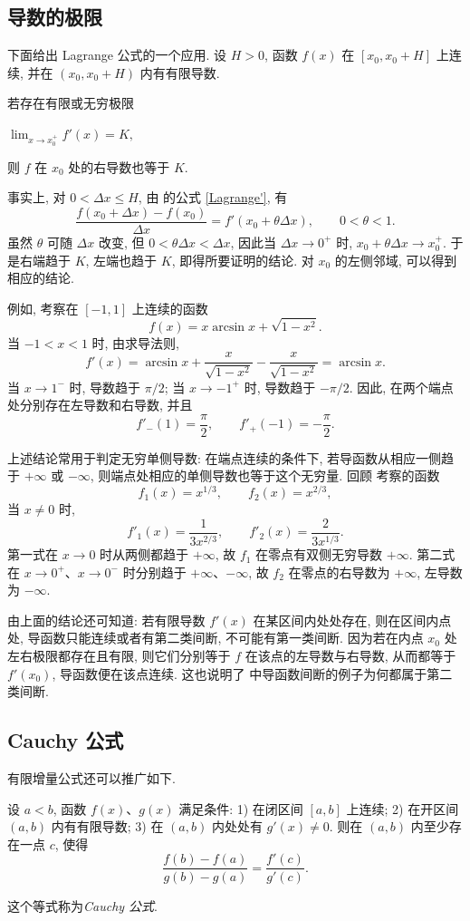 \subsection{导数的极限}\label{subsec:113}
下面给出 Lagrange 公式的一个应用.
设 $H>0$, 函数 $f(x)$ 在 $[x_0,x_0+H]$ 上连续,
并在 $(x_0,x_0+H)$ 内有有限导数.
{\kaishu 若存在有限或无穷极限
\begin{center}
$
\displaystyle\lim_{x\to x_0^+}f'(x)=K,
$\end{center}
则 $f$ 在 $x_0$ 处的右导数也等于 $K$.}

事实上, 对 $0<\Delta x\leq H$, 由  的公式 \eqref{Lagrange'}, 有
$$
\frac{f(x_0+\Delta x)-f(x_0)}{\Delta x}
=f'(x_0+\theta\Delta x),\qquad0<\theta<1.
$$
虽然 $\theta$ 可随 $\Delta x$ 改变, 但
$0<\theta\Delta x<\Delta x$, 因此当 $\Delta x\to0^+$ 时,
$x_0+\theta\Delta x\to x_0^+$.
于是右端趋于 $K$, 左端也趋于 $K$, 即得所要证明的结论.
对 $x_0$ 的左侧邻域, 可以得到相应的结论.

例如, 考察在 $[-1,1]$ 上连续的函数
$$
f(x)=x\arcsin x+\sqrt{1-x^2}.
$$
当 $-1<x<1$ 时, 由求导法则,
$$
f'(x)=\arcsin x+\frac{x}{\sqrt{1-x^2}}
-\frac{x}{\sqrt{1-x^2}}=\arcsin x.
$$
当 $x\to1^-$ 时, 导数趋于 $\pi/2$;
当 $x\to-1^+$ 时, 导数趋于 $-\pi/2$.
因此, 在两个端点处分别存在左导数和右导数, 并且
$$
f'_-(1)=\frac\pi2,\qquad f'_+(-1)=-\frac\pi2.
$$

上述结论常用于判定无穷单侧导数:
在端点连续的条件下, 若导函数从相应一侧趋于 $+\infty$ 或 $-\infty$,
则端点处相应的单侧导数也等于这个无穷量.
回顾  考察的函数
$$
f_1(x)=x^{1/3},\qquad f_2(x)=x^{2/3},
$$
当 $x\neq0$ 时,
$$
f'_1(x)=\frac1{3x^{2/3}},\qquad f'_2(x)=\frac2{3x^{1/3}}.
$$
第一式在 $x\to0$ 时从两侧都趋于 $+\infty$, 故 $f_1$ 在零点有双侧无穷导数 $+\infty$.
第二式在 $x\to0^+$、$x\to0^-$ 时分别趋于 $+\infty$、$-\infty$,
故 $f_2$ 在零点的右导数为 $+\infty$, 左导数为 $-\infty$.

由上面的结论还可知道:
{\kaishu 若有限导数 $f'(x)$ 在某区间内处处存在,
则在区间内点处, 导函数只能连续或者有第二类间断, 不可能有第一类间断.}
因为若在内点 $x_0$ 处左右极限都存在且有限,
则它们分别等于 $f$ 在该点的左导数与右导数,
从而都等于 $f'(x_0)$, 导函数便在该点连续.
这也说明了  中导函数间断的例子为何都属于第二类间断.

\subsection{Cauchy 公式}\label{subsec:114}
有限增量公式还可以推广如下.

\begin{theorem}[Cauchy]\label{thm:cauchy_mean_value}
设 $a<b$, 函数 $f(x)$、$g(x)$ 满足条件:
1) 在闭区间 $[a,b]$ 上连续;
2) 在开区间 $(a,b)$ 内有有限导数;
3) 在 $(a,b)$ 内处处有 $g'(x)\neq0$.
则在 $(a,b)$ 内至少存在一点 $c$, 使得
\begin{equation}\label{Cauchy}
\frac{f(b)-f(a)}{g(b)-g(a)}=\frac{f'(c)}{g'(c)}.
\end{equation}
\end{theorem}
这个等式称为\emph{Cauchy 公式}.

